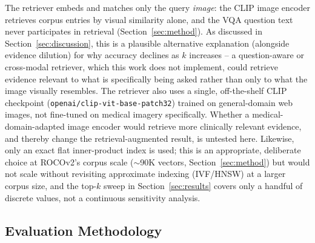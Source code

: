 The retriever embeds and matches only the query \emph{image}: the CLIP
image encoder retrieves corpus entries by visual similarity alone, and the
VQA question text never participates in retrieval (Section~\ref{sec:method}).
As discussed in Section~\ref{sec:discussion}, this is a plausible
alternative explanation (alongside evidence dilution) for why accuracy
declines as $k$ increases -- a question-aware or cross-modal retriever,
which this work does not implement, could retrieve evidence relevant to
what is specifically being asked rather than only to what the image
visually resembles. The retriever also uses a single, off-the-shelf CLIP
checkpoint (\texttt{openai/clip-vit-base-patch32}) trained on
general-domain web images, not fine-tuned on medical imagery specifically.
Whether a medical-domain-adapted image encoder would retrieve more
clinically relevant evidence, and thereby change the retrieval-augmented
result, is untested here. Likewise, only an exact flat inner-product index
is used; this is an appropriate, deliberate choice at ROCOv2's corpus scale
($\sim$90K vectors, Section~\ref{sec:method}) but would not scale without
revisiting approximate indexing (IVF/HNSW) at a larger corpus size, and the
top-$k$ sweep in Section~\ref{sec:results} covers only a handful of
discrete values, not a continuous sensitivity analysis.

\subsection{Evaluation Methodology}

